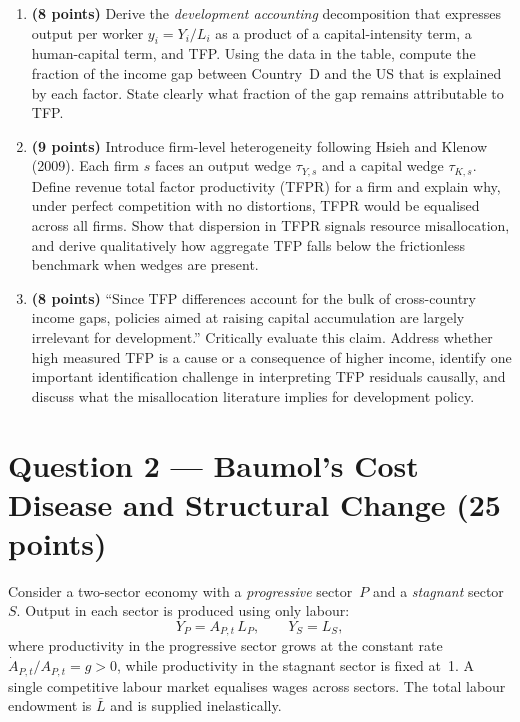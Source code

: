 \documentclass[a4paper,11pt]{article}
\begin{document}
\begin{enumerate}[label=\textbf{\arabic*.}, leftmargin=*, itemsep=8pt]

    \item \textbf{(8 points)} Derive the \emph{development accounting} decomposition that
    expresses output per worker $y_i = Y_i/L_i$ as a product of a capital-intensity term,
    a human-capital term, and TFP.  Using the data in the table, compute the fraction of the
    income gap between Country~D and the US that is explained by each factor.
    State clearly what fraction of the gap remains attributable to TFP.

    \item \textbf{(9 points)} Introduce firm-level heterogeneity following Hsieh and Klenow
    (2009).  Each firm $s$ faces an output wedge $\tau_{Y,s}$ and a capital wedge
    $\tau_{K,s}$.  Define revenue total factor productivity (TFPR) for a firm and explain
    why, under perfect competition with no distortions, TFPR would be equalised across all
    firms.  Show that dispersion in TFPR signals resource misallocation, and derive
    qualitatively how aggregate TFP falls below the frictionless benchmark when wedges are
    present.

    \item \textbf{(8 points)} ``Since TFP differences account for the bulk of cross-country
    income gaps, policies aimed at raising capital accumulation are largely irrelevant for
    development.''  Critically evaluate this claim.  Address whether high measured TFP is a
    cause or a consequence of higher income, identify one important identification challenge
    in interpreting TFP residuals causally, and discuss what the misallocation literature
    implies for development policy.

\end{enumerate}

\clearpage

\section{Question 2 --- Baumol's Cost Disease and Structural Change \hfill (25 points)}

Consider a two-sector economy with a \emph{progressive} sector~$P$ and a \emph{stagnant}
sector~$S$.  Output in each sector is produced using only labour:
\[
    Y_P = A_{P,t}\,L_P, \qquad Y_S = L_S,
\]
where productivity in the progressive sector grows at the constant rate
$\dot{A}_{P,t}/A_{P,t} = g > 0$, while productivity in the stagnant sector is fixed at~1.
A single competitive labour market equalises wages across sectors.  The total labour
endowment is $\bar{L}$ and is supplied inelastically.
\end{document}
